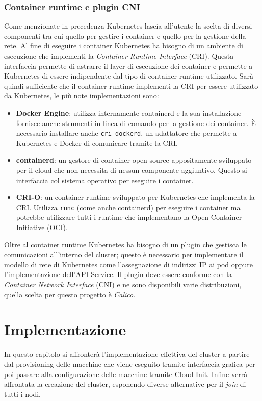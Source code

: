 \documentclass[12pt,a4paper,openright,twoside]{book}
\begin{document}
\subsection{Container runtime e plugin CNI}
%
%
Come menzionate in precedenza Kubernetes lascia all'utente la scelta di diversi componenti tra cui quello per gestire i container e quello per la gestione della rete\cite{kubernetes}.
Al fine di eseguire i container Kubernetes ha bisogno di un ambiente di esecuzione che implementi la \textit{Container Runtime Interface} (CRI).
Questa interfaccia permette di astrarre il layer di esecuzione dei container e permette a Kubernetes di essere indipendente dal tipo di container runtime utilizzato. 
Sarà quindi sufficiente che il container runtime implementi la CRI per essere utilizzato da Kubernetes, le più note implementazioni sono:
\begin{itemize}
    \item \textbf{Docker Engine}: utilizza internamente containerd e la sua installazione fornisce anche strumenti in linea di comando per la gestione dei container. 
        È necessario installare anche \texttt{cri-dockerd}, un adattatore che permette a Kubernetes e Docker di comunicare tramite la CRI.
    \item \textbf{containerd}: un gestore di container open-source appositamente sviluppato per il cloud che non necessita di nessun componente aggiuntivo. 
        Questo si interfaccia col sistema operativo per eseguire i container.
    \item \textbf{CRI-O}: un container runtime sviluppato per Kubernetes che implementa la CRI. Utilizza \texttt{runc} (come anche containerd) per eseguire i container ma potrebbe utilizzare
        tutti i runtime che implementano la Open Container Initiative (OCI).
\end{itemize}
Oltre al container runtime Kubernetes ha bisogno di un plugin che gestisca le comunicazioni all'interno del cluster; questo è
necessario per implementare il modello di rete di Kubernetes come l'assegnazione di indirizzi IP ai pod oppure l'implementazione dell'API Service.
Il plugin deve essere conforme con la \textit{Container Network Interface} (CNI) e ne sono disponibili varie distribuzioni, quella scelta per questo progetto è
\textit{Calico}.
%
\chapter{Implementazione}
In questo capitolo si affronterà l'implementazione effettiva del cluster a partire dal provisioning delle macchine che viene eseguito tramite interfaccia grafica
per poi passare alla configurazione delle macchine tramite Cloud-Init. Infine verrà affrontata la creazione del cluster, esponendo diverse alternative per il \textit{join}
di tutti i nodi.
\end{document}
